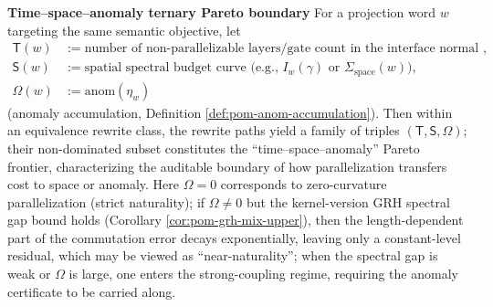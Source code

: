 \begin{remark}\label{rem:pom-pareto-ts-omega}
\medskip\noindent\textbf{Time--space--anomaly ternary Pareto boundary}
For a projection word \(w\) targeting the same semantic objective, let
\[
\begin{aligned}
\mathsf T(w)&:=\text{number of non-parallelizable layers/gate count in the interface normal form},\\
\mathsf S(w)&:=\text{spatial spectral budget curve (e.g., }I_w(\gamma)\text{ or }\Sigma_{\mathrm{space}}(w)\text{)},\\
\Omega(w)&:=\mathrm{anom}(\eta_w)
\end{aligned}
\]
(anomaly accumulation, Definition \ref{def:pom-anom-accumulation}).
Then within an equivalence rewrite class, the rewrite paths yield a family of triples \((\mathsf T,\mathsf S,\Omega)\); their non-dominated subset constitutes the ``time--space--anomaly'' Pareto frontier, characterizing the auditable boundary of how parallelization transfers cost to space or anomaly.
Here \(\Omega=0\) corresponds to zero-curvature parallelization (strict naturality); if \(\Omega\neq 0\) but the kernel-version GRH spectral gap bound holds (Corollary \ref{cor:pom-grh-mix-upper}), then the length-dependent part of the commutation error decays exponentially, leaving only a constant-level residual, which may be viewed as ``near-naturality''; when the spectral gap is weak or \(\Omega\) is large, one enters the strong-coupling regime, requiring the anomaly certificate to be carried along.
\end{remark}

